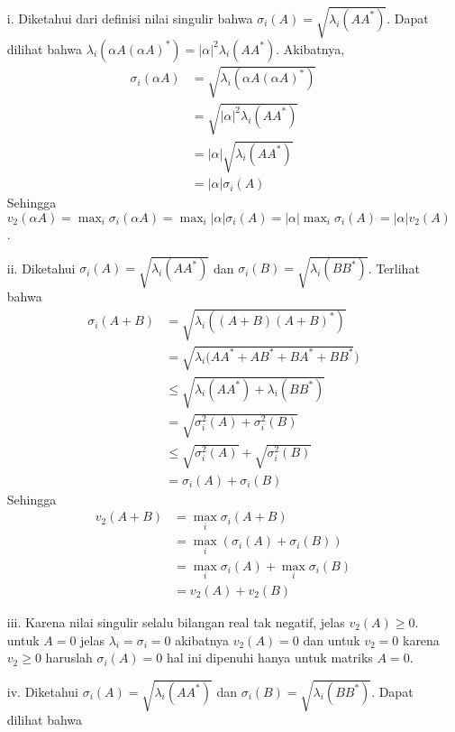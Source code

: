 \documentclass[11pt,a4paper]{article}
\newcommand{\ds}{\displaystyle}
\theoremstyle{plain}
\theoremstyle{definition}
\theoremstyle{remark}
\begin{document}
\begin{enumerate}
\begin{enumerate}
\begin{enumerate}
\begin{enumerate}
			\item[i.] Diketahui dari definisi nilai singulir bahwa $\sigma_{i}(A)=\sqrt{\lambda_{i}(AA^{\ast})}$. Dapat dilihat bahwa $\lambda_{i}(\alpha A(\alpha A)^{\ast})=|\alpha|^{2}\lambda_{i}(AA^{\ast})$. Akibatnya,
			\begin{align*}
			\sigma_{i}(\alpha A) &= \sqrt{\lambda_{i}(\alpha A (\alpha A)^{\ast})} \\
			&= \sqrt{\left| \alpha\right|^{2} \lambda_{i}(AA^{\ast})} \\
			&= \left| \alpha\right| \sqrt{\lambda_{i}(AA^{\ast})} \\
			&= \left| \alpha\right| \sigma_{i}(A)
			\end{align*}
			Sehingga $v_{2}(\alpha A)=\ds \max_{i} \sigma_{i}(\alpha A) = \max_{i} \left|\alpha\right| \sigma_{i}(A) = \left| \alpha\right| \max_{i} \sigma_{i}(A) = \left| \alpha\right|v_{2}(A)$.
			\item[ii.] Diketahui $\sigma_{i}(A)=\sqrt{\lambda_{i}(AA^{\ast})}$ dan $\sigma_{i}(B)=\sqrt{\lambda_{i}(BB^{\ast})}$. Terlihat bahwa
			\begin{align*}
			\sigma_{i}(A+B) &= \sqrt{\lambda_{i}((A+B)(A+B)^{\ast})} \\
			&= \sqrt{\lambda_{i}(AA^{\ast}+AB^{\ast}+BA^{\ast}+BB^{\ast}}) \\
			&\leq \sqrt{\lambda_{i}(AA^{\ast})+\lambda_{i}(BB^{\ast})} \\
			&= \sqrt{\sigma_{i}^{2}(A)+\sigma_{i}^{2}(B)} \\
			&\leq \sqrt{\sigma_{i}^{2}(A)}+\sqrt{\sigma_{i}^{2}(B)} \\
			&= \sigma_{i}(A)+\sigma_{i}(B)
			\end{align*}
			Sehingga
			\begin{align*}
			v_{2}(A+B) &= \ds \max_{i} \sigma_{i}(A+B) \\
			&= \ds \max_{i} (\sigma_{i}(A)+\sigma_{i}(B)) \\
			&= \ds \max_{i} \sigma_{i}(A)+ \max_{i} \sigma_{i}(B) \\
			&= v_{2}(A)+v_{2}(B)
			\end{align*}
			\item[iii.] Karena nilai singulir selalu bilangan real tak negatif, jelas $v_{2}(A)\geq 0$. untuk $A=0$ jelas $\lambda_{i}=\sigma_{i}=0$ akibatnya $v_{2}(A)=0$ dan untuk $v_{2}=0$ karena $v_{2}\geq 0$ haruslah $\sigma_{i}(A)=0$ hal ini dipenuhi hanya untuk matriks $A=0$. 
			\item[iv.] Diketahui $\sigma_{i}(A)=\sqrt{\lambda_{i}(AA^{\ast})}$ dan $\sigma_{i}(B)=\sqrt{\lambda_{i}(BB^{\ast})}$. Dapat dilihat bahwa

\end{enumerate}
\end{enumerate}
\end{enumerate}
\end{enumerate}
\end{document}
